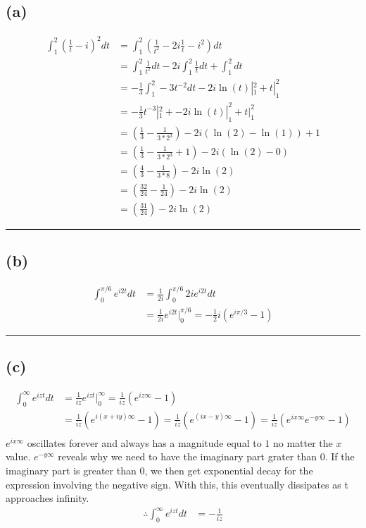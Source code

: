 \documentclass{article}
\begin{document}
\subsection*{(a)}
\begin{align*}
  \int_1^2 (\frac{1}{t}-i)^2 dt &= \int_1^2 (\frac{1}{t^2} - 2i\frac{1}{t} -i^2) dt \\
  &= \int_1^2\frac{1}{t^2}dt -2i\int_1^2\frac{1}{t}dt + \int_1^2dt \\ 
  &= -\frac{1}{3}\int_1^2-3t^{-2}dt -2i\ln{(t)}|_1^2 + t|_1^2 \\ 
                                &=  -\frac{1}{3}t^{-3}|_1^2 + -2i\ln{(t)}|_1^2 + t|_1^2 \\
                                &= \left(\frac{1}{3}-\frac{1}{3*2^3}\right) - 2i(\ln{(2)}-\ln{(1)}) + 1 \\
                                &= \left(\frac{1}{3}-\frac{1}{3*2^3} + 1 \right) - 2i(\ln{(2)}-0) \\
                                &= \left(\frac{4}{3}-\frac{1}{3*8} \right) - 2i\ln{(2)} \\
                                &= \left(\frac{32}{24}-\frac{1}{24} \right) - 2i\ln{(2)} \\
                                &= \left(\frac{31}{24} \right) - 2i\ln{(2)} 
\end{align*}
\hrule
\subsection*{(b)}
\begin{align*}
  \int_0^{\pi/6} e^{i2t}dt &= \frac{1}{2i}\int_0^{\pi/6} 2ie^{i2t}dt \\
  &= \frac{1}{2i} e^{i2t}|_0^{\pi/6} = -\frac{1}{2}i(e^{i\pi/3} - 1)
\end{align*}
\hrule
\subsection*{(c)}
\begin{align*}
  \int_0^{\infty} e^{izt}dt &=  \frac{1}{iz}e^{izt}|_0^{\infty} = \frac{1}{iz}(e^{iz\infty}-1) \\
  &= \frac{1}{iz}(e^{i(x+iy)\infty}-1) = \frac{1}{iz}(e^{(ix-y)\infty}-1) = \frac{1}{iz}(e^{ix\infty}e^{-y\infty}-1) \\
\end{align*}
$e^{ix\infty}$ oscillates forever and always has a magnitude equal to $1$ no matter the $x$ value. $e^{-y\infty}$ reveals why we need to have the imaginary part grater than $0$. If the imaginary part is greater than 0, we then get exponential decay for the expression involving the negative sign. With this, this eventually dissipates as t approaches infinity.
\begin{align*}
\therefore  \int_0^{\infty} e^{izt}dt &= -\frac{1}{iz}
\end{align*}
\newpage
\end{document}
